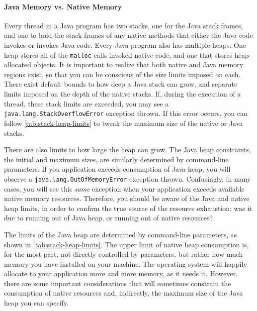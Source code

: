 \paragraph{Java Memory vs. Native Memory}
Every thread in a Java program has two stacks, one for the Java stack frames,
and one to hold the stack frames of any native methods that either the Java code
invokes or invokes Java code. Every Java program also has multiple heaps. One
heap stores all of the {\tt malloc} calls invoked native code, and one that
stores heap-allocated objects. It is important to realize that both native and
Java memory regions exist, so that you can be conscious of the size limits
imposed on each. There exist default bounds to how deep a Java stack can grow,
and separate limits imposed on the depth of the native stacks. If, during
the execution of a thread, these stack limits are exceeded, you may see a {\tt
java.lang.StackOverflowError} exception
thrown. If this error occurs, you can follow
\autoref{tab:stack-heap-limits} to tweak the maximum size of the native or Java
stacks.

There are also limits to how large the heap can grow. The Java heap constraints,
the initial and maximum sizes, are similarly determined by command-line
parameters. If you application exceeds consumption of Java heap, you will
observe a {\tt java.lang.OutOfMemoryError} exception
thrown. Confusingly, in many cases, you will
see this \emph{same} exception when your application exceeds available native
memory resources. Therefore, you should be aware of the Java and native heap
limits, in order to confirm the true source of the resource exhaustion: was it
due to running out of Java heap, or running out of native resources?

The limits of the Java heap are determined by command-line parameters, as shown
in \autoref{tab:stack-heap-limits}. The upper limit of native heap consumption
is, for the most part, not directly controlled by parameters, but rather how
much memory you have installed on your machine. The operating system will
happily allocate to your application more and more memory, as it needs it.
However, there are some important considerations that will sometimes constrain
the consumption of native resources and, indirectly, the maximum size of the
Java heap you can specify.

